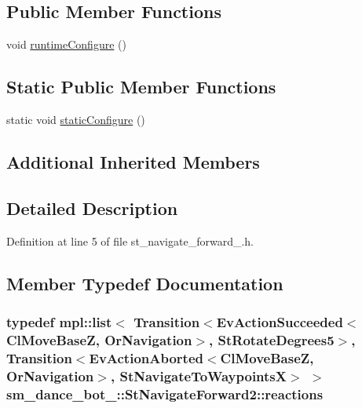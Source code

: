 \subsection*{Public Member Functions}
\begin{DoxyCompactItemize}
\item 
void \hyperlink{structsm__dance__bot__3_1_1StNavigateForward2_a3b253a26c299252bd5b2bf13b36cbb01}{runtime\+Configure} ()
\end{DoxyCompactItemize}
\subsection*{Static Public Member Functions}
\begin{DoxyCompactItemize}
\item 
static void \hyperlink{structsm__dance__bot__3_1_1StNavigateForward2_a91b549d61f30bd3110c64adaf1968fc3}{static\+Configure} ()
\end{DoxyCompactItemize}
\subsection*{Additional Inherited Members}


\subsection{Detailed Description}


Definition at line 5 of file st\+\_\+navigate\+\_\+forward\+\_.\+h.



\subsection{Member Typedef Documentation}
\subsubsection[{\texorpdfstring{reactions}{reactions}}]{\setlength{\rightskip}{0pt plus 5cm}typedef mpl\+::list$<$ Transition$<$Ev\+Action\+Succeeded$<${\bf Cl\+Move\+BaseZ}, {\bf Or\+Navigation}$>$, {\bf St\+Rotate\+Degrees5}$>$, Transition$<$Ev\+Action\+Aborted$<${\bf Cl\+Move\+BaseZ}, {\bf Or\+Navigation}$>$, {\bf St\+Navigate\+To\+WaypointsX}$>$ $>$ {\bf sm\+\_\+dance\+\_\+bot\+\_\+::\+St\+Navigate\+Forward2\+::reactions}}\hypertarget{structsm__dance__bot__3_1_1StNavigateForward2_a3b94719f33fff52840cf5f577695194b}{}\label{structsm__dance__bot__3_1_1StNavigateForward2_a3b94719f33fff52840cf5f577695194b}


